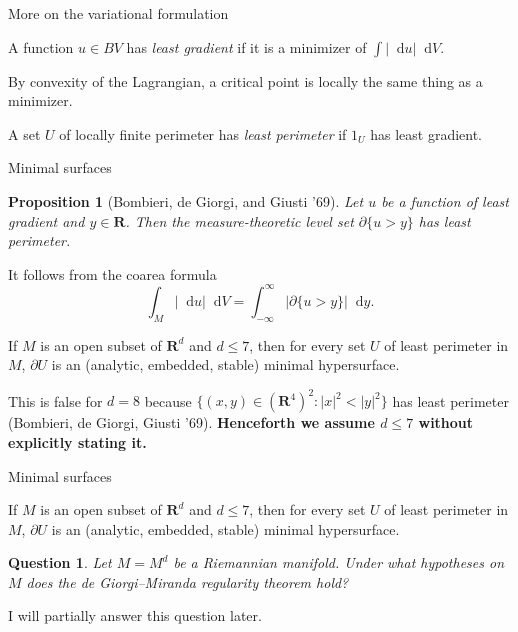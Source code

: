 \documentclass[10pt]{beamer}
\newcommand{\RR}{\mathbf{R}}
\newcommand*\dif{\mathop{}\!\mathrm{d}}
\newcommand{\dfn}[1]{\emph{#1}\index{#1}}
\newtheorem{proposition}{Proposition}
\newtheorem{question}{Question}
\begin{document}
\begin{frame}{More on the variational formulation}
\begin{definition}
A function $u \in BV$ has \dfn{least gradient} if it is a minimizer of $\int |\dif u| \dif V$.  
\end{definition}

\pause

By convexity of the Lagrangian, a critical point is locally the same thing as a minimizer.

\pause

\begin{definition}
A set $U$ of locally finite perimeter has \dfn{least perimeter} if $1_U$ has least gradient.
\end{definition}
\end{frame}


\begin{frame}{Minimal surfaces}
\begin{proposition}[Bombieri, de Giorgi, and Giusti '69]
Let $u$ be a function of least gradient and $y \in \RR$.
Then the measure-theoretic level set $\partial \{u > y\}$ has least perimeter.
\end{proposition}

\pause

It follows from the coarea formula
$$\int_M |\dif u| \dif V = \int_{-\infty}^\infty |\partial \{u > y\}| \dif y.$$

\pause

\begin{theorem}
If $M$ is an open subset of $\RR^d$ and $d \leq 7$, then for every set $U$ of least perimeter in $M$, $\partial U$ is an (analytic, embedded, stable) minimal hypersurface.
\end{theorem}

\pause 

This is false for $d = 8$ because $\{(x, y) \in (\RR^4)^2: |x|^2 < |y|^2\}$ has least perimeter (Bombieri, de Giorgi, Giusti '69). \pause \textbf{Henceforth we assume $d \leq 7$ without explicitly stating it.}

\end{frame}

\begin{frame}{Minimal surfaces}
\begin{theorem}
If $M$ is an open subset of $\RR^d$ and $d \leq 7$, then for every set $U$ of least perimeter in $M$, $\partial U$ is an (analytic, embedded, stable) minimal hypersurface.
\end{theorem}

\pause

\begin{question}
Let $M = M^d$ be a Riemannian manifold.
Under what hypotheses on $M$ does the de Giorgi--Miranda regularity theorem hold?
\end{question}

\pause

I will partially answer this question later.
\end{frame}
\end{document}
